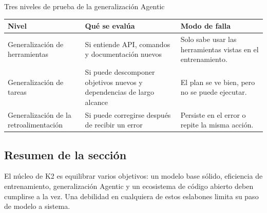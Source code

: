 \begin{knowledgebox}{Tres niveles de prueba de la generalización Agentic}
\begin{tabularx}{\textwidth}{p{}p{}X}
\toprule
Nivel & Qué se evalúa & Modo de falla \\
\midrule
Generalización de herramientas & Si entiende API, comandos y documentación nuevos & Solo sabe usar las herramientas vistas en el entrenamiento. \\
Generalización de tareas & Si puede descomponer objetivos nuevos y dependencias de largo alcance & El plan se ve bien, pero no se puede ejecutar. \\
Generalización de la retroalimentación & Si puede corregirse después de recibir un error & Persiste en el error o repite la misma acción. \\
\bottomrule
\end{tabularx}
\end{knowledgebox}

\subsection{Resumen de la sección}

El núcleo de K2 es equilibrar varios objetivos: un modelo base sólido, eficiencia de entrenamiento, generalización Agentic y un ecosistema de código abierto deben cumplirse a la vez. Una debilidad en cualquiera de estos eslabones limita su paso de modelo a sistema.
